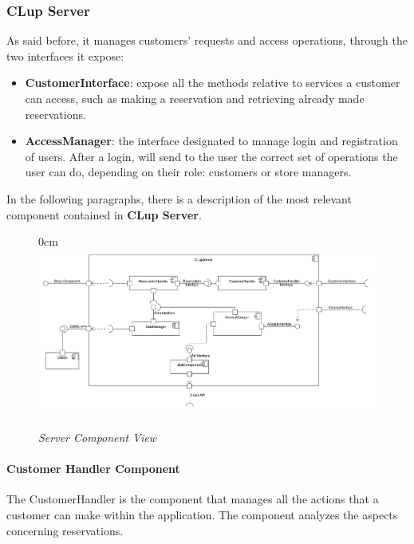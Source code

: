 \documentclass{article}
\begin{document}
			\subsubsection{CLup Server}
			As said before, it manages customers’ requests and access operations, through the two interfaces it expose:
			
			\begin{itemize}
				\item {\bfseries CustomerInterface}: expose all the methods relative to services a customer can access, such as making a reservation and retrieving already made reservations.
				
				\item {\bfseries AccessManager}: the interface designated to manage login and registration of users. After a login, will send to the user the correct set of operations the user can do, depending on their role: customers or store managers.
			\end{itemize}
			
			In the following paragraphs, there is a description of the most relevant component contained in {\bfseries CLup Server}.
			\begin{figure}
				\begin{adjustwidth} {0cm}{}
					\centering
					\includegraphics[scale=0.37, angle=90, trim= 0 0 0 -5cm]{Component Diagrams/ServerComponentView.pdf}\\
				\end{adjustwidth}
				\caption{\emph{Server Component View}}
			\end{figure}
			\newpage
				\paragraph{Customer Handler Component}
					The CustomerHandler is the component that manages all the actions that a customer can make within the application. The component analyzes the aspects concerning reservations.
					
\end{document}
